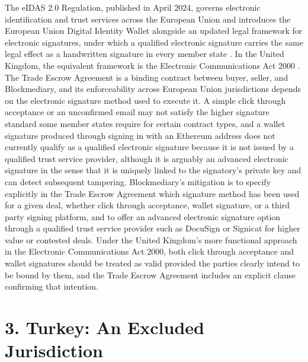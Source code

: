 \documentclass[12pt, a4paper]{article}
\begin{document}
The eIDAS 2.0 Regulation, published in April 2024, governs electronic identification and
trust services across the European Union and introduces the European Union Digital
Identity Wallet alongside an updated legal framework for electronic signatures, under
which a qualified electronic signature carries the same legal effect as a handwritten
signature in every member state \citep{eidas2024}. In the United Kingdom, the equivalent
framework is the Electronic Communications Act 2000 \citep{ukeca2000}. The Trade Escrow
Agreement is a binding contract between buyer, seller, and Blockmediary, and its
enforceability across European Union jurisdictions depends on the electronic signature
method used to execute it. A simple click through acceptance or an unconfirmed email may
not satisfy the higher signature standard some member states require for certain contract
types, and a wallet signature produced through signing in with an Ethereum address does
not currently qualify as a qualified electronic signature because it is not issued by a
qualified trust service provider, although it is arguably an advanced electronic signature
in the sense that it is uniquely linked to the signatory's private key and can detect
subsequent tampering. Blockmediary's mitigation is to specify explicitly in the Trade
Escrow Agreement which signature method has been used for a given deal, whether click
through acceptance, wallet signature, or a third party signing platform, and to offer an
advanced electronic signature option through a qualified trust service provider such as
DocuSign or Signicat for higher value or contested deals. Under the United Kingdom's more
functional approach in the Electronic Communications Act 2000, both click through
acceptance and wallet signatures should be treated as valid provided the parties clearly
intend to be bound by them, and the Trade Escrow Agreement includes an explicit clause
confirming that intention.

\section*{3. Turkey: An Excluded Jurisdiction}
\end{document}
